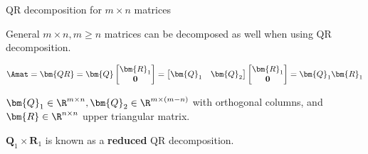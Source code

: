 \documentclass[11pt,compress,t,notes=noshow, xcolor=table]{beamer}
\begin{document}
\begin{vbframe}{QR decomposition for $m \times n$ matrices}

General $m \times n, m \ge n$ matrices can be decomposed as well when using QR decomposition.

$$
\Amat = \bm{QR} = \bm{Q} \begin{bmatrix} \bm{R}_1 \\ \mathbf{0} \end{bmatrix} = \begin{bmatrix} \bm{Q}_1 & \bm{Q}_2 \end{bmatrix} \begin{bmatrix} \bm{R}_1 \\ \mathbf{0} \end{bmatrix} = \bm{Q}_1 \bm{R}_1
$$

$\bm{Q}_1 \in \R^{m \times n}, \bm{Q}_2 \in \R^{m\times(m-n)}$ with orthogonal columns, and $\bm{R} \in \R^{n \times n}$ upper triangular matrix.

\lz

$\bm{Q}_1 \times \bm{R}_1$ is known as a \textbf{reduced} QR decomposition.

\end{vbframe}


\endlecture
\end{document}

